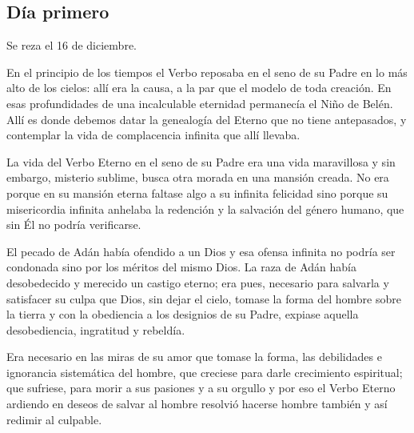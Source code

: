 \documentclass[spanish,utf8,twocolumn]{chlart}
\newenvironment{summary}{\begingroup
	\small\sffamily\itshape%
	\setlength{\leftskip}{3em}\setlength{\rightskip}{3em}\noindent
	}{\par\endgroup}
\newenvironment{lectura}{\begingroup\color{lector}}{\endgroup\par}
\begin{document}
\subsection*{Día primero}
\begin{summary}
Se reza el 16 de diciembre.
\end{summary}
\begin{lectura}
En el principio de los tiempos el Verbo reposaba en el seno de su Padre
en lo más alto de los cielos:
allí era la causa, a la par que el modelo de toda creación.
En esas profundidades de una incalculable eternidad permanecía el Niño
de Belén.
Allí es donde debemos datar la genealogía del Eterno que no tiene
antepasados, y contemplar la vida de complacencia infinita que allí
llevaba.

La vida del Verbo Eterno en el seno de su Padre era una vida maravillosa
y sin embargo, misterio sublime, busca otra morada en una mansión
creada.
No era porque en su mansión eterna faltase algo a su infinita felicidad
sino porque su misericordia infinita anhelaba la redención y la
salvación del género humano, que sin Él no podría verificarse.

El pecado de Adán había ofendido a un Dios y esa ofensa infinita no
podría ser condonada sino por los méritos del mismo Dios.
La raza de Adán había desobedecido y merecido un castigo eterno; era
pues, necesario para salvarla y satisfacer su culpa que Dios, sin dejar
el cielo, tomase la forma del hombre sobre la tierra y con la obediencia
a los designios de su Padre, expiase aquella desobediencia, ingratitud y
rebeldía.

Era necesario en las miras de su amor que tomase la forma, las
debilidades e ignorancia sistemática del hombre, que creciese para darle
crecimiento espiritual; que sufriese, para morir a sus pasiones y a su
orgullo y por eso el Verbo Eterno ardiendo en deseos de salvar al hombre
resolvió hacerse hombre también y así redimir al culpable.
\end{lectura}
\end{document}
